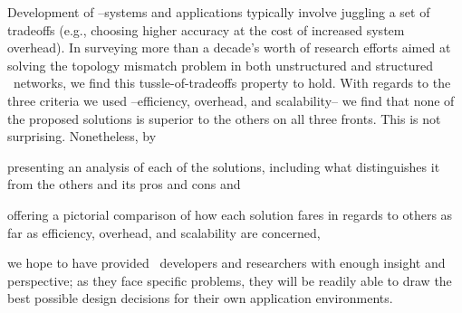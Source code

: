 Development of \p--systems and applications
typically involve juggling a set of tradeoffs (e.g.,
choosing higher accuracy at the cost of increased system overhead).
In surveying more than
a decade's worth of research efforts aimed at solving the topology mismatch
problem in both unstructured and structured \p\ networks, we find this
tussle-of-tradeoffs property to hold.  
With regards to the three criteria we used --efficiency,
overhead, and scalability-- we find that none of the proposed solutions 
is superior to the others on all three fronts.  This is not surprising.
Nonetheless, by
\begin{inparaenum}
  \item presenting an analysis of each of the solutions,
including what distinguishes it from the
others and its pros and cons and
  \item offering a pictorial
comparison of how each solution fares in regards to others as far as
efficiency, overhead, and scalability are concerned,
\end{inparaenum}
we hope to have provided \p\
developers and researchers with enough insight and perspective;
as they face specific problems, they will be readily able to 
draw the best possible design decisions for their own application
environments.

